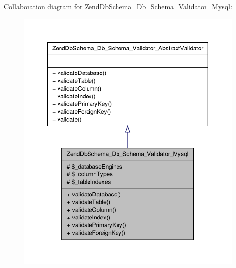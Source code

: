 \-Collaboration diagram for \-Zend\-Db\-Schema\-\_\-\-Db\-\_\-\-Schema\-\_\-\-Validator\-\_\-\-Mysql\-:\nopagebreak
\begin{figure}[H]
\begin{center}
\leavevmode
\includegraphics[width=350pt]{classZendDbSchema__Db__Schema__Validator__Mysql__coll__graph}
\end{center}
\end{figure}

